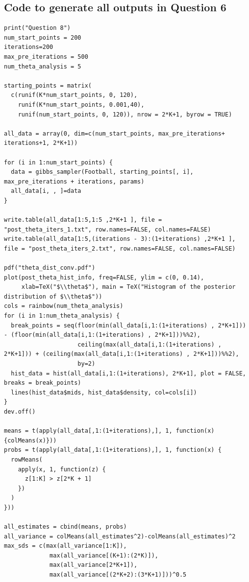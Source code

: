 \documentclass[11pt]{article} %
\begin{document}
\subsection*{Code to generate all outputs in Question 6}
\begin{lstlisting}
print("Question 8")
num_start_points = 200
iterations=200
max_pre_iterations = 500
num_theta_analysis = 5

starting_points = matrix(
  c(runif(K*num_start_points, 0, 120),
    runif(K*num_start_points, 0.001,40),
    runif(num_start_points, 0, 120)), nrow = 2*K+1, byrow = TRUE)

all_data = array(0, dim=c(num_start_points, max_pre_iterations+ iterations+1, 2*K+1))

for (i in 1:num_start_points) {
  data = gibbs_sampler(Football, starting_points[, i], max_pre_iterations + iterations, params)
  all_data[i, , ]=data
}

write.table(all_data[1:5,1:5 ,2*K+1 ], file = "post_theta_iters_1.txt", row.names=FALSE, col.names=FALSE)
write.table(all_data[1:5,(iterations - 3):(1+iterations) ,2*K+1 ], file = "post_theta_iters_2.txt", row.names=FALSE, col.names=FALSE)

pdf("theta_dist_conv.pdf")
plot(post_theta_hist_info, freq=FALSE, ylim = c(0, 0.14), 
     xlab=TeX("$\\theta$"), main = TeX("Histogram of the posterior distribution of $\\theta$"))
cols = rainbow(num_theta_analysis)
for (i in 1:num_theta_analysis) {
  break_points = seq(floor(min(all_data[i,1:(1+iterations) , 2*K+1])) - (floor(min(all_data[i,1:(1+iterations) , 2*K+1]))%%2),
                     ceiling(max(all_data[i,1:(1+iterations) , 2*K+1])) + (ceiling(max(all_data[i,1:(1+iterations) , 2*K+1]))%%2),
                     by=2)
  hist_data = hist(all_data[i,1:(1+iterations), 2*K+1], plot = FALSE, breaks = break_points)
  lines(hist_data$mids, hist_data$density, col=cols[i])
}
dev.off()

means = t(apply(all_data[,1:(1+iterations),], 1, function(x) {colMeans(x)}))
probs = t(apply(all_data[,1:(1+iterations),], 1, function(x) {
  rowMeans(
    apply(x, 1, function(z) {
      z[1:K] > z[2*K + 1]
    })
  )
}))

all_estimates = cbind(means, probs)
all_variance = colMeans(all_estimates^2)-colMeans(all_estimates)^2
max_sds = c(max(all_variance[1:K]),
             max(all_variance[(K+1):(2*K)]),
             max(all_variance[2*K+1]),
             max(all_variance[(2*K+2):(3*K+1)]))^0.5


\end{lstlisting}
\end{document}
